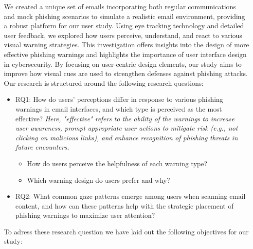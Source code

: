 \documentclass[
  a4paper,  %
  twoside,  %
  bibliography=totoc,
  headsepline,
  cleardoublepage=empty,
  parskip=half,
  draft=false
]{scrbook}
\begin{document}
We created a unique set of emails incorporating both regular communications and mock phishing scenarios to simulate a realistic email environment, providing a robust platform for our user study. Using eye tracking technology and detailed user feedback, we explored how users perceive, understand, and react to various visual warning strategies. This investigation offers insights into the design of more effective phishing warnings and highlights the importance of user interface design in cybersecurity. By focusing on user-centric design elements, our study aims to improve how visual cues are used to strengthen defenses against phishing attacks. Our research is structured around the following research questions:

\begin{itemize}
    \item RQ1: How do users' perceptions differ in response to various phishing warnings in email interfaces, and which type is perceived as the most effective? \textit{Here, "effective" refers to the ability of the warnings to increase user awareness, prompt appropriate user actions to mitigate risk (e.g., not clicking on malicious links), and enhance recognition of phishing threats in future encounters.}
        \begin{itemize}
            \item How do users perceive the helpfulness of each warning type?
        \end{itemize}
        \begin{itemize}
            \item Which warning design do users prefer and why?
        \end{itemize}
    \item RQ2: What common gaze patterns emerge among users when scanning email content, and how can these patterns help with the strategic placement of phishing warnings to maximize user attention?
\end{itemize}

To adress these research question we have laid out the following objectives for our study:
\end{document}
